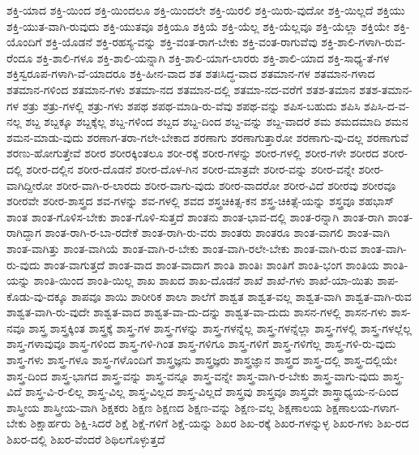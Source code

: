 {ಶಕ್ತಿ-ಯಾದ
ಶಕ್ತಿ-ಯಿಂದ
ಶಕ್ತಿ-ಯಿಂದಲೂ
ಶಕ್ತಿ-ಯಿಂದಲೇ
ಶಕ್ತಿ-ಯಿರಲಿ
ಶಕ್ತಿ-ಯಿರು-ವುದೋ
ಶಕ್ತಿ-ಯಿಲ್ಲದೆ
ಶಕ್ತಿಯು
ಶಕ್ತಿ-ಯುತ-ವಾಗಿ-ರುವುದು
ಶಕ್ತಿ-ಯುತವೂ
ಶಕ್ತಿಯೂ
ಶಕ್ತಿಯೆ
ಶಕ್ತಿ-ಯೆಲ್ಲ
ಶಕ್ತಿ-ಯೆಲ್ಲವೂ
ಶಕ್ತಿ-ಯೆಲ್ಲಾ
ಶಕ್ತಿಯೇ
ಶಕ್ತಿ-ಯೊಂದಿಗೆ
ಶಕ್ತಿ-ಯೊಡನೆ
ಶಕ್ತಿ-ರಹಸ್ಯ-ವನ್ನು
ಶಕ್ತಿ-ವಂತ-ರಾಗ-ಬೇಕು
ಶಕ್ತಿ-ವಂತ-ರಾಗುವೆವು
ಶಕ್ತಿ-ಶಾಲಿ-ಗಳಾಗಿ-ರುವ-ರೆಂದೂ
ಶಕ್ತಿ-ಶಾಲಿ-ಗಳೂ
ಶಕ್ತಿ-ಶಾಲಿ-ಯನ್ನಾಗಿ
ಶಕ್ತಿ-ಶಾಲಿ-ಯಾಗ-ಲಾರರು
ಶಕ್ತಿ-ಶಾಲಿ-ಯಾದ
ಶಕ್ತಿ-ಸಾಧ್ಯ-ತೆ-ಗಳ
ಶಕ್ತಿಸ್ವರೂಪ-ಗಳಾಗಿ-ವೆ-ಯಾದರೂ
ಶಕ್ತಿ-ಹೀನ-ವಾದ
ಶತ
ಶತಃಸಿದ್ಧ-ವಾದ
ಶತಮಾನ-ಗಳ
ಶತಮಾನ-ಗಳಾದ
ಶತಮಾನ-ಗಳಿಂದ
ಶತಮಾನ-ಗಳು
ಶತಮಾ-ನದ
ಶತಮಾನ-ದಲ್ಲಿ
ಶತಮಾ-ನದ-ವರೆಗೆ
ಶತಶ-ತಮಾನ
ಶತಶ-ತಮಾನ-ಗಳ
ಶತ್ರು
ಶತ್ರು-ಗಳಲ್ಲಿ
ಶತ್ರು-ಗಳು
ಶಪಥ
ಶಪಥ-ಮಾಡಿ-ರು-ವೆವು
ಶಪಥ-ವನ್ನು
ಶಪಿಸ-ಬಹುದು
ಶಪಿಸಿ
ಶಪಿಸಿ-ದ-ವ-ನಲ್ಲ
ಶಬ್ದ
ಶಬ್ದಕ್ಕೂ
ಶಬ್ದಕ್ಕೆಲ್ಲ
ಶಬ್ದ-ಗಳಿಂದ
ಶಬ್ದದ
ಶಬ್ದ-ದಿಂದ
ಶಬ್ದ-ವನ್ನು
ಶಬ್ದ-ವಾದರೆ
ಶಮ
ಶಮದಮಾದಿ
ಶಮನ
ಶಮನ-ಮಾಡು-ವುದು
ಶರಣಾಗ-ತರಾ-ಗಲೇ-ಬೇಕಾದ
ಶರಣಾಗು
ಶರಣಾಗುತ್ತಾರೋ
ಶರಣಾಗು-ವು-ದಲ್ಲ
ಶರಣಾಗುವೆ
ಶರಣು-ಹೋಗುತ್ತೇವೆ
ಶರೀರ
ಶರೀರಕ್ಕಿಂತಲೂ
ಶರೀ-ರಕ್ಕೆ
ಶರೀರ-ಗಳನ್ನು
ಶರೀರ-ಗಳಲ್ಲಿ
ಶರೀರ-ಗಳೇ
ಶರೀರದ
ಶರೀರ-ದಲ್ಲಿ
ಶರೀರ-ದಲ್ಲಿನ
ಶರೀರ-ದೊಡನೆ
ಶರೀರ-ದೊಳ-ಗಿನ
ಶರೀರ-ಮಾತ್ರವೇ
ಶರೀರ-ವನ್ನು
ಶರೀರ-ವನ್ನೇ
ಶರೀರ-ವಾಗಿದ್ದೀರೋ
ಶರೀರ-ವಾಗಿ-ರ-ಲಾರದು
ಶರೀರ-ವಾಗು-ವುದು
ಶರೀರ-ವಾದರೋ
ಶರೀರ-ವಿದೆ
ಶರೀರವು
ಶರೀರವೂ
ಶರೀರವೇ
ಶರೀರ-ಶಾಸ್ತ್ರದ
ಶವ-ಗಳನ್ನು
ಶವ-ಗಳಲ್ಲಿ
ಶವದ
ಶಸ್ತ್ರಚಿಕಿತ್ಸ-ಕನ
ಶಸ್ತ್ರ-ಚಿಕಿತ್ಸೆ-ಯನ್ನು
ಶಸ್ತ್ರವೂ
ಶಹಭಾಸ್
ಶಾಂತ
ಶಾಂತ-ಗೊಳಿಸ-ಬೇಕು
ಶಾಂತ-ಗೊಳಿ-ಸುತ್ತದೆ
ಶಾಂತನು
ಶಾಂತ-ಭಾವ-ದಲ್ಲಿ
ಶಾಂತ-ರನ್ನಾಗಿ
ಶಾಂತ-ರಾಗಿ
ಶಾಂತ-ರಾಗಿದ್ದಾಗ
ಶಾಂತ-ರಾಗಿ-ರ-ಬಾ-ರದೇಕೆ
ಶಾಂತ-ರಾಗಿ-ರು-ವರು
ಶಾಂತರು
ಶಾಂತರೂ
ಶಾಂತ-ವಾಗಲಿ
ಶಾಂತ-ವಾಗಿ
ಶಾಂತ-ವಾಗಿತ್ತು
ಶಾಂತ-ವಾಗಿಯೆ
ಶಾಂತ-ವಾಗಿ-ರ-ಬೇಕು
ಶಾಂತ-ವಾಗಿ-ರಲೇ-ಬೇಕು
ಶಾಂತ-ವಾಗಿ-ರುವ
ಶಾಂತ-ವಾಗಿ-ರು-ವುದು
ಶಾಂತ-ವಾಗುತ್ತದೆ
ಶಾಂತ-ವಾದ
ಶಾಂತ-ವಾದಾಗ
ಶಾಂತಿ
ಶಾಂತಿಃ
ಶಾಂತಿಗೆ
ಶಾಂತಿ-ಭಂಗ
ಶಾಂತಿಯ
ಶಾಂತಿ-ಯನ್ನು
ಶಾಂತಿ-ಯಿಂದ
ಶಾಂತಿ-ಯಿಲ್ಲ
ಶಾಖ
ಶಾಖದ
ಶಾಖ-ದೊಡನೆ
ಶಾಖೆ
ಶಾಖೆ-ಗಳು
ಶಾಖೆ-ಯಾ-ಯಿತು
ಶಾಪ-ಕೊಡು-ವು-ದಕ್ಕೂ
ಶಾಪವೂ
ಶಾಯಿ
ಶಾರೀರಿಕ
ಶಾಲಾ
ಶಾಲೆಗೆ
ಶಾಶ್ವತ
ಶಾಶ್ವತ-ವಲ್ಲ
ಶಾಶ್ವತ-ವಾಗಿ
ಶಾಶ್ವತ-ವಾಗಿ-ರುವ
ಶಾಶ್ವತ-ವಾಗಿ-ರು-ವುದೇ
ಶಾಶ್ವತ-ವಾದ
ಶಾಶ್ವತ-ವಾ-ದು-ದನ್ನು
ಶಾಶ್ವತ-ವಾ-ದುದು
ಶಾಸನ-ಗಳಲ್ಲಿ
ಶಾಸನ-ಗಳು
ಶಾಸ-ನವೂ
ಶಾಸ್ತ್ರ
ಶಾಸ್ತ್ರಕ್ಕಿಂತ
ಶಾಸ್ತ್ರಕ್ಕೆ
ಶಾಸ್ತ್ರ-ಗಳ
ಶಾಸ್ತ್ರ-ಗಳನ್ನು
ಶಾಸ್ತ್ರ-ಗಳನ್ನೆಲ್ಲ
ಶಾಸ್ತ್ರ-ಗಳನ್ನೆಲ್ಲಾ
ಶಾಸ್ತ್ರ-ಗಳಲ್ಲಿ
ಶಾಸ್ತ್ರ-ಗಳಲ್ಲೆಲ್ಲ
ಶಾಸ್ತ್ರ-ಗಳಾವುವೂ
ಶಾಸ್ತ್ರ-ಗಳಿಂದ
ಶಾಸ್ತ್ರ-ಗಳಿ-ಗಿಂತ
ಶಾಸ್ತ್ರ-ಗಳಿಗೂ
ಶಾಸ್ತ್ರ-ಗಳಿಗೆ
ಶಾಸ್ತ್ರ-ಗಳಿಗೆಲ್ಲ
ಶಾಸ್ತ್ರ-ಗಳಿ-ರು-ವುದು
ಶಾಸ್ತ್ರ-ಗಳು
ಶಾಸ್ತ್ರ-ಗಳೂ
ಶಾಸ್ತ್ರ-ಗಳೊಂದಿಗೆ
ಶಾಸ್ತ್ರಜ್ಞನು
ಶಾಸ್ತ್ರಜ್ಞರು
ಶಾಸ್ತ್ರಜ್ಞಾನ
ಶಾಸ್ತ್ರದ
ಶಾಸ್ತ್ರ-ದಲ್ಲಿ
ಶಾಸ್ತ್ರ-ದಲ್ಲಿಯೇ
ಶಾಸ್ತ್ರ-ದಿಂದ
ಶಾಸ್ತ್ರ-ಭಾಗದ
ಶಾಸ್ತ್ರ-ವನ್ನು
ಶಾಸ್ತ್ರ-ವನ್ನೂ
ಶಾಸ್ತ್ರ-ವನ್ನೇ
ಶಾಸ್ತ್ರ-ವಾಗಿ-ರ-ಬೇಕು
ಶಾಸ್ತ್ರ-ವಾಗು-ವುದು
ಶಾಸ್ತ್ರ-ವಿದೆ
ಶಾಸ್ತ್ರ-ವಿ-ರ-ಲಿಲ್ಲ
ಶಾಸ್ತ್ರ-ವಿಲ್ಲ
ಶಾಸ್ತ್ರ-ವಿಲ್ಲದ
ಶಾಸ್ತ್ರ-ವಿಲ್ಲದೆ
ಶಾಸ್ತ್ರವು
ಶಾಸ್ತ್ರವೂ
ಶಾಸ್ತ್ರವೇ
ಶಾಸ್ತ್ರಾಧ್ಯಯ-ನ-ದಿಂದ
ಶಾಸ್ತ್ರೀಯ
ಶಾಸ್ತ್ರೀಯ-ವಾಗಿ
ಶಿಕ್ಷಕರು
ಶಿಕ್ಷಣ
ಶಿಕ್ಷಣದ
ಶಿಕ್ಷಣ-ವನ್ನು
ಶಿಕ್ಷಣ-ವಲ್ಲ
ಶಿಕ್ಷಣಾಲಯ
ಶಿಕ್ಷಣಾಲಯ-ಗಳಾಗ-ಬೇಕು
ಶಿಕ್ಷಾರ್ಹರು
ಶಿಕ್ಷಿ-ಸಿದರೆ
ಶಿಕ್ಷೆ
ಶಿಕ್ಷೆ-ಗಳಿಗೆ
ಶಿಕ್ಷೆ-ಯನ್ನು
ಶಿಖರ
ಶಿಖ-ರಕ್ಕೆ
ಶಿಖರ-ಗಳನ್ನುಳ್ಳ
ಶಿಖರ-ಗಳು
ಶಿಖ-ರದ
ಶಿಖರ-ದಲ್ಲಿ
ಶಿಖರ-ವೆಂದರೆ
ಶಿಥಿಲಗೊಳ್ಳುತ್ತದೆ
}
